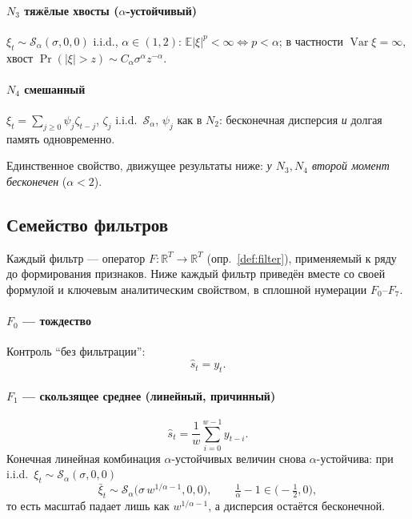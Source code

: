 \documentclass[conference]{IEEEtran}
\theoremstyle{plain}
\theoremstyle{definition}
\newcommand{\R}{\mathbb{R}}
\newcommand{\E}{\mathbb{E}}
\newcommand{\Sstable}{\mathcal{S}_\alpha}
\DeclareMathOperator{\Var}{Var}
\begin{document}
\paragraph*{$N_3$ тяжёлые хвосты ($\alpha$-устойчивый)}
$\xi_t\sim\Sstable(\sigma,0,0)$ i.i.d., $\alpha\in(1,2)$:
$\E|\xi|^p<\infty\iff p<\alpha$; в частности $\Var\xi=\infty$,
хвост $\Pr(|\xi|>z)\sim C_\alpha\sigma^\alpha z^{-\alpha}$.

\paragraph*{$N_4$ смешанный}
$\xi_t=\sum_{j\ge0}\psi_j\zeta_{t-j}$, $\zeta_j$ i.i.d.\ $\Sstable$,
$\psi_j$ как в $N_2$: бесконечная дисперсия \emph{и} долгая память
одновременно.

Единственное свойство, движущее результаты ниже: \emph{у $N_3,N_4$
второй момент бесконечен} ($\alpha<2$).

\subsection{Семейство фильтров}
Каждый фильтр --- оператор $F\colon\R^T\to\R^T$ (опр.~\ref{def:filter}),
применяемый к ряду до формирования признаков. Ниже каждый фильтр
приведён вместе со своей формулой и ключевым аналитическим свойством, в
сплошной нумерации $F_0$--$F_7$.

\paragraph*{$F_0$ --- тождество}
Контроль ``без фильтрации'':
\begin{equation}
\hat s_t = y_t.
\end{equation}

\paragraph*{$F_1$ --- скользящее среднее (линейный, причинный)}
\begin{equation}
\hat s_t=\frac1w\sum_{i=0}^{w-1}y_{t-i}.
\end{equation}
Конечная линейная комбинация $\alpha$-устойчивых величин снова
$\alpha$-устойчива: при i.i.d.\ $\xi_t\sim\Sstable(\sigma,0,0)$
\begin{equation}
\bar\xi_t\sim\Sstable\!\big(\sigma\,w^{1/\alpha-1},0,0\big),\qquad
\tfrac1\alpha-1\in\big(-\tfrac12,0\big),\label{eq:ma-scale}
\end{equation}
то есть масштаб падает лишь как $w^{1/\alpha-1}$, а дисперсия остаётся
бесконечной.
\end{document}
